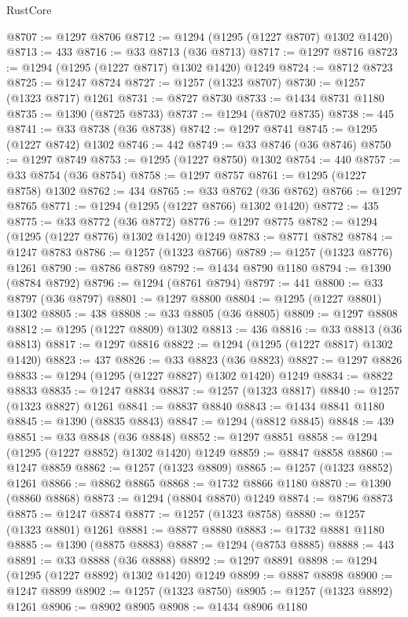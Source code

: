 \begin{lexlean}{RustCore}
\begin{coremodule}
@8707 := @1297 @8706
@8712 := @1294 (@1295 (@1227 @8707) @1302 @1420)
@8713 := 433
@8716 := @33 @8713 (@36 @8713)
@8717 := @1297 @8716
@8723 := @1294 (@1295 (@1227 @8717) @1302 @1420) @1249
@8724 := @8712 @8723
@8725 := @1247 @8724
@8727 := @1257 (@1323 @8707)
@8730 := @1257 (@1323 @8717) @1261
@8731 := @8727 @8730
@8733 := @1434 @8731 @1180
@8735 := @1390 (@8725 @8733)
@8737 := @1294 (@8702 @8735)
@8738 := 445
@8741 := @33 @8738 (@36 @8738)
@8742 := @1297 @8741
@8745 := @1295 (@1227 @8742) @1302
@8746 := 442
@8749 := @33 @8746 (@36 @8746)
@8750 := @1297 @8749
@8753 := @1295 (@1227 @8750) @1302
@8754 := 440
@8757 := @33 @8754 (@36 @8754)
@8758 := @1297 @8757
@8761 := @1295 (@1227 @8758) @1302
@8762 := 434
@8765 := @33 @8762 (@36 @8762)
@8766 := @1297 @8765
@8771 := @1294 (@1295 (@1227 @8766) @1302 @1420)
@8772 := 435
@8775 := @33 @8772 (@36 @8772)
@8776 := @1297 @8775
@8782 := @1294 (@1295 (@1227 @8776) @1302 @1420) @1249
@8783 := @8771 @8782
@8784 := @1247 @8783
@8786 := @1257 (@1323 @8766)
@8789 := @1257 (@1323 @8776) @1261
@8790 := @8786 @8789
@8792 := @1434 @8790 @1180
@8794 := @1390 (@8784 @8792)
@8796 := @1294 (@8761 @8794)
@8797 := 441
@8800 := @33 @8797 (@36 @8797)
@8801 := @1297 @8800
@8804 := @1295 (@1227 @8801) @1302
@8805 := 438
@8808 := @33 @8805 (@36 @8805)
@8809 := @1297 @8808
@8812 := @1295 (@1227 @8809) @1302
@8813 := 436
@8816 := @33 @8813 (@36 @8813)
@8817 := @1297 @8816
@8822 := @1294 (@1295 (@1227 @8817) @1302 @1420)
@8823 := 437
@8826 := @33 @8823 (@36 @8823)
@8827 := @1297 @8826
@8833 := @1294 (@1295 (@1227 @8827) @1302 @1420) @1249
@8834 := @8822 @8833
@8835 := @1247 @8834
@8837 := @1257 (@1323 @8817)
@8840 := @1257 (@1323 @8827) @1261
@8841 := @8837 @8840
@8843 := @1434 @8841 @1180
@8845 := @1390 (@8835 @8843)
@8847 := @1294 (@8812 @8845)
@8848 := 439
@8851 := @33 @8848 (@36 @8848)
@8852 := @1297 @8851
@8858 := @1294 (@1295 (@1227 @8852) @1302 @1420) @1249
@8859 := @8847 @8858
@8860 := @1247 @8859
@8862 := @1257 (@1323 @8809)
@8865 := @1257 (@1323 @8852) @1261
@8866 := @8862 @8865
@8868 := @1732 @8866 @1180
@8870 := @1390 (@8860 @8868)
@8873 := @1294 (@8804 @8870) @1249
@8874 := @8796 @8873
@8875 := @1247 @8874
@8877 := @1257 (@1323 @8758)
@8880 := @1257 (@1323 @8801) @1261
@8881 := @8877 @8880
@8883 := @1732 @8881 @1180
@8885 := @1390 (@8875 @8883)
@8887 := @1294 (@8753 @8885)
@8888 := 443
@8891 := @33 @8888 (@36 @8888)
@8892 := @1297 @8891
@8898 := @1294 (@1295 (@1227 @8892) @1302 @1420) @1249
@8899 := @8887 @8898
@8900 := @1247 @8899
@8902 := @1257 (@1323 @8750)
@8905 := @1257 (@1323 @8892) @1261
@8906 := @8902 @8905
@8908 := @1434 @8906 @1180

\end{coremodule}
\end{lexlean}
